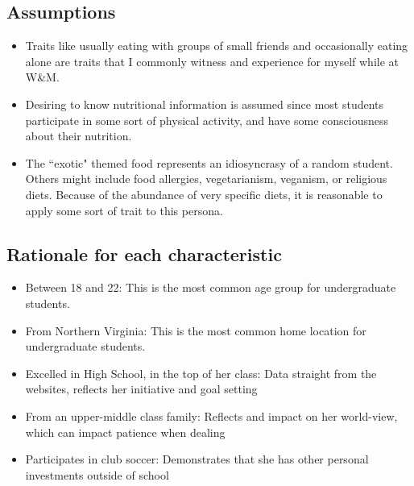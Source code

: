 \documentclass[5pt]{article} %
\begin{document}

\subsection{Assumptions}
\begin{itemize}
\item Traits like usually eating with groups of small friends and occasionally eating alone are traits that I commonly witness and experience for myself while at W\&M. 
\item Desiring to know nutritional information is assumed since most students participate in some sort of physical activity, and have some consciousness about their nutrition. 
\item The ``exotic" themed food represents an idiosyncrasy of a random student. Others might include food allergies, vegetarianism, veganism, or religious diets. Because of the abundance of very specific diets, it is reasonable to apply some sort of trait to this persona. 
\end{itemize}
\subsection{Rationale for each characteristic}
\begin{itemize}
\item Between 18 and 22: This is the most common age group for undergraduate students.  
\item From Northern Virginia: This is the most common home location for undergraduate students.  
\item Excelled in High School, in the top of her class: Data straight from the websites, reflects her initiative and goal setting
\item From an upper-middle class family: Reflects and impact on her world-view, which can impact patience when dealing
\item Participates in club soccer: Demonstrates that she has other personal investments outside of school
\end{itemize}
\end{document}
